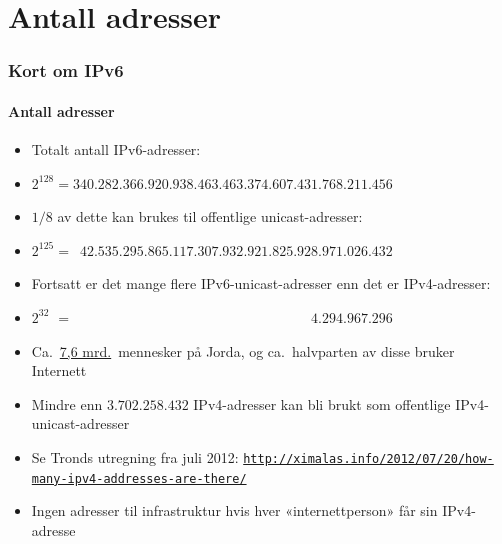 \section{Antall adresser}
\begin{frame}
  \frametitle{Kort om IPv6}
  \framesubtitle{Antall adresser}
  \begin{itemize}
  \item Totalt antall IPv6-adresser:
  \item \(2^{128}=340.282.366.920.938.463.463.374.607.431.768.211.456\)
  \item \(1/8\) av dette kan brukes til offentlige unicast-adresser:
  \item
    \(2^{125}=\phantom{0}42.535.295.865.117.307.932.921.825.928.971.026.432\)
  \item Fortsatt er det mange flere IPv6-unicast-adresser enn det er
    IPv4-adresser:
  \item
    \(2^{32\phantom{0}}=\phantom{000.000.000.000.000.000.000.000.000.00}4.294.967.296\)
  \item Ca.\ \href{https://en.wikipedia.org/wiki/World_population}{7,6
      mrd.}\ mennesker på Jorda, og ca.\ halvparten av disse bruker Internett
  \item Mindre enn \alert<2>{\(3.702.258.432\)} IPv4-adresser kan bli
    brukt som offentlige IPv4-unicast-adresser
  \item Se Tronds utregning fra juli 2012:
    \texttt{\url{http://ximalas.info/2012/07/20/how-many-ipv4-addresses-are-there/}}
  \item Ingen adresser til infrastruktur hvis hver «internettperson»
    får sin IPv4-adresse
  \end{itemize}
\end{frame}

